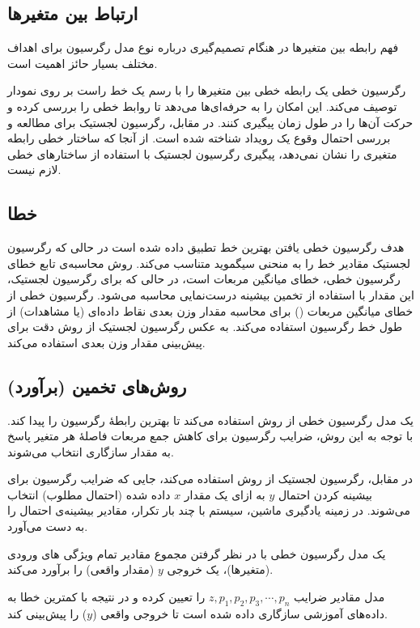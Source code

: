 \documentclass{article}
\begin{document}
\subsection{ارتباط بین متغیرها}

فهم رابطه بین متغیرها در هنگام تصمیم‌گیری درباره نوع مدل رگرسیون برای اهداف مختلف بسیار حائز اهمیت است.

رگرسیون خطی یک رابطه خطی بین متغیرها را با رسم یک خط راست بر روی نمودار توصیف می‌کند. این امکان را به حرفه‌ای‌ها می‌دهد تا روابط خطی را بررسی کرده و حرکت آن‌ها را در طول زمان پیگیری کنند. در مقابل، رگرسیون لجستیک برای مطالعه و بررسی احتمال وقوع یک رویداد شناخته شده است. از آنجا که ساختار خطی رابطه متغیری را نشان نمی‌دهد، پیگیری رگرسیون لجستیک با استفاده از ساختارهای خطی لازم نیست.

\subsection{خطا}
هدف رگرسیون خطی یافتن بهترین خط تطبیق داده شده است در حالی که رگرسیون لجستیک مقادیر خط را به منحنی سیگموید متناسب می‌کند. روش محاسبه‌ی تابع خطای رگرسیون خطی، خطای میانگین مربعات است، در حالی که برای رگرسیون لجستیک، این مقدار با استفاده از تخمین بیشینه درست‌نمایی محاسبه می‌شود. رگرسیون خطی از خطای میانگین مربعات () برای محاسبه مقدار وزن بعدی نقاط داده‌ای (یا مشاهدات) از طول خط رگرسیون استفاده می‌کند. به عکس رگرسیون لجستیک از روش دقت برای پیش‌بینی مقدار وزن بعدی استفاده می‌کند.

\subsection{روش‌های تخمین (برآورد)}
یک مدل رگرسیون خطی از روش  استفاده می‌کند تا بهترین رابطۀ رگرسیون را پیدا کند. با توجه به این روش، ضرایب رگرسیون برای کاهش جمع مربعات فاصلۀ هر متغیر پاسخ به مقدار سازگاری انتخاب می‌شوند.

در مقابل، رگرسیون لجستیک از روش  استفاده می‌کند، جایی که ضرایب رگرسیون برای بیشینه کردن احتمال $y$ به ازای یک مقدار $x$ داده شده (احتمال مطلوب) انتخاب می‌شوند. در زمینه یادگیری ماشین، سیستم با چند بار تکرار، مقادیر بیشینه‌ی احتمال را به دست می‌آورد.

یک مدل رگرسیون خطی با در نظر گرفتن مجموع مقادیر تمام ویژگی های ورودی (متغیرها)، یک خروجی $y$ (مقدار واقعی) را برآورد می‌کند.

مدل مقادیر ضرایب $z, p_1, p_2, p_3, \cdots , p_n$ را تعیین کرده و در نتیجه با کمترین خطا به داده‌های آموزشی سازگاری داده شده است تا خروجی واقعی ($y$) را پیش‌بینی کند.
\end{document}
